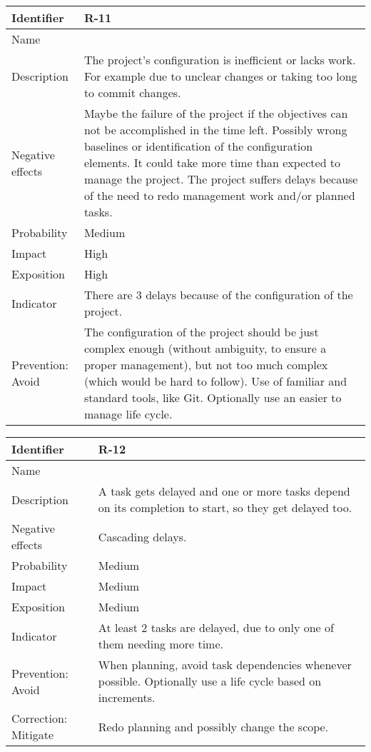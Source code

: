 \begin{table}[H]
	\begin{tabularx}{\textwidth}{|y|z|}
		\hline
		Identifier & \textbf{R-11} \\ \hline
		Name & \Ronce \\ \hline
		Description &
			The project's configuration is inefficient or lacks work. \linej
			For example due to unclear changes or taking too long to commit changes.
		\\ \hline
		Negative effects &
			Maybe the failure of the project if the objectives can not be accomplished in the time left. \linej
			Possibly wrong baselines or identification of the configuration elements. \linej
			It could take more time than expected to manage the project. \linej
			The project suffers delays because of the need to redo management work and/or planned tasks.
		\\ \hline
		Probability & Medium\\ \hline
		Impact &  High\\ \hline
		Exposition &  High\\ \hline
		Indicator & There are 3 delays because of the configuration of the project.\\ \hline
		Prevention: Avoid &
			The configuration of the project should be just complex enough (without ambiguity, to ensure a proper management), but not too much complex (which would be hard to follow). \linej
			Use of familiar and standard tools, like Git. \linej
			Optionally use an easier to manage life cycle.
		\\ \hline
	\end{tabularx}
\end{table}

\begin{table}[H]
	\begin{tabularx}{\textwidth}{|y|z|}
		\hline
		Identifier & \textbf{R-12} \\ \hline
		Name & \Rdoce \\ \hline
		Description &
			A task gets delayed and one or more tasks depend on its completion to start, so they get delayed too.
		\\ \hline
		Negative effects &
			Cascading delays.
		\\ \hline
		Probability & Medium\\ \hline
		Impact &  Medium\\ \hline
		Exposition &  Medium\\ \hline
		Indicator & At least 2 tasks are delayed, due to only one of them needing more time.\\ \hline
		Prevention: Avoid &
			When planning, avoid task dependencies whenever possible. \linej
			Optionally use a life cycle based on increments.
		\\ \hline
		Correction: Mitigate &
			Redo planning and possibly change the scope.
		\\ \hline
	\end{tabularx}
\end{table}

